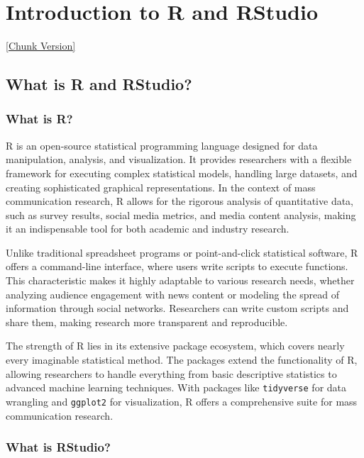 \documentclass[
]{book}
\begin{document}
\chapter{Introduction to R and RStudio}\label{introduction-to-r-and-rstudio}

\href{_book/files/07-intro_R-chunks.Rmd}{{[}Chunk Version{]}}

\section{What is R and RStudio?}\label{what-is-r-and-rstudio}

\subsection*{What is R?}\label{what-is-r}

R is an open-source statistical programming language designed for data manipulation, analysis, and visualization. It provides researchers with a flexible framework for executing complex statistical models, handling large datasets, and creating sophisticated graphical representations. In the context of mass communication research, R allows for the rigorous analysis of quantitative data, such as survey results, social media metrics, and media content analysis, making it an indispensable tool for both academic and industry research.

Unlike traditional spreadsheet programs or point-and-click statistical software, R offers a command-line interface, where users write scripts to execute functions. This characteristic makes it highly adaptable to various research needs, whether analyzing audience engagement with news content or modeling the spread of information through social networks. Researchers can write custom scripts and share them, making research more transparent and reproducible.

The strength of R lies in its extensive package ecosystem, which covers nearly every imaginable statistical method. The packages extend the functionality of R, allowing researchers to handle everything from basic descriptive statistics to advanced machine learning techniques. With packages like \texttt{tidyverse} for data wrangling and \texttt{ggplot2} for visualization, R offers a comprehensive suite for mass communication research.

\subsection*{What is RStudio?}\label{what-is-rstudio}
\end{document}
